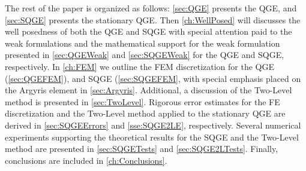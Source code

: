 The rest of the paper is organized as follows: \autoref{sec:QGE} presents the
QGE, and \autoref{sec:SQGE} presents the stationary QGE. Then
\autoref{ch:WellPosed} will discusses the well posedness of both the QGE and
SQGE with special attention paid to the weak formulations and the mathematical
support for the weak formulation presented in \autoref{sec:QGEWeak} and
\autoref{sec:SQGEWeak} for the QGE and SQGE, respectively. In \autoref{ch:FEM}
we outline the FEM discretization for the QGE (\autoref{sec:QGEFEM}), and SQGE
(\autoref{sec:SQGEFEM}, with special emphasis placed on the Argyris element in
\autoref{sec:Argyris}. Additional, a discussion of the Two-Level method is
presented in \autoref{sec:TwoLevel}. Rigorous error estimates for the FE
discretization and the Two-Level method applied to the stationary QGE are
derived in \autoref{sec:SQGEErrors} and \autoref{sse:SQGE2LE}, respectively.
Several numerical experiments supporting the theoretical results for the SQGE
and the Two-Level method are presented in \autoref{sec:SQGETests} and
\autoref{sec:SQGE2LTests}. Finally, conclusions are included in
\autoref{ch:Conclusions}.



